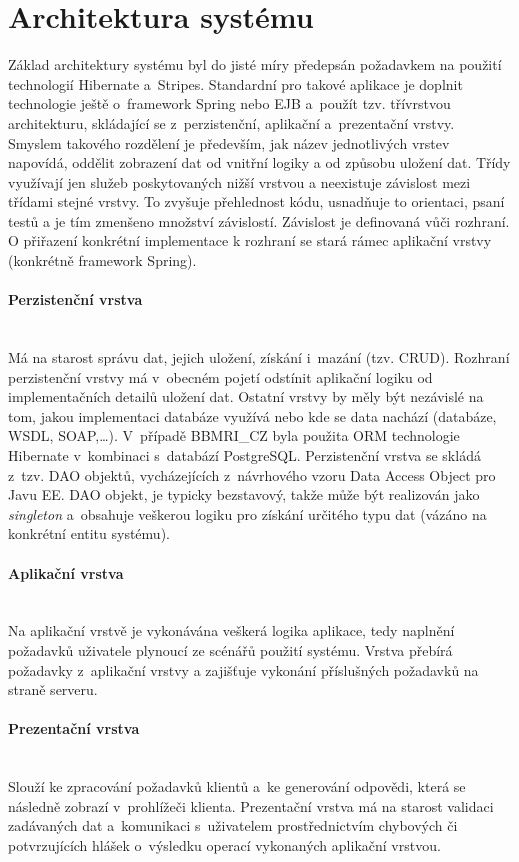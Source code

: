 \documentclass[11pt,draft,oneside]{fithesis2}
\newcommand{\paragraphNewLine}[1]{\paragraph*{#1}\mbox{}\\}
\newcommand{\ProjectName}{BBMRI\_CZ\xspace}
\begin{document}
\section{Architektura systému}
Základ architektury systému byl do jisté míry předepsán požadavkem na použití technologií Hibernate a~Stripes. Standardní pro takové aplikace je doplnit technologie ještě o~framework Spring nebo EJB a~použít tzv. třívrstvou architekturu, skládající se z~perzistenční, aplikační a~prezentační vrstvy. Smyslem takového rozdělení je především, jak název jednotlivých vrstev napovídá, oddělit zobrazení dat od vnitřní logiky a od způsobu uložení dat. Třídy využívají jen služeb poskytovaných nižší vrstvou a neexistuje závislost mezi třídami stejné vrstvy. To zvyšuje přehlednost kódu, usnadňuje to orientaci, psaní testů a je tím zmenšeno množství závislostí. Závislost je definovaná vůči rozhraní. O přiřazení konkrétní implementace k rozhraní se stará rámec aplikační vrstvy (konkrétně framework Spring).  

\paragraphNewLine{Perzistenční vrstva}
Má na starost správu dat, jejich uložení, získání i~mazání (tzv. CRUD). Rozhraní perzistenční vrstvy má v~obecném pojetí odstínit aplikační logiku od implementačních detailů uložení dat. Ostatní vrstvy by měly být nezávislé na tom, jakou implementaci databáze využívá nebo kde se data nachází (databáze, WSDL, SOAP,\ldots). V~případě \ProjectName byla použita ORM technologie Hibernate v~kombinaci s~databází PostgreSQL. 
Perzistenční vrstva se skládá z~tzv. DAO objektů, vycházejících z~návrhového vzoru Data Access Object pro Javu EE. DAO objekt, je typicky bezstavový, takže může být realizován jako \textit{singleton} a~obsahuje veškerou logiku pro získání určitého typu dat (vázáno na konkrétní entitu systému).

\paragraphNewLine{Aplikační vrstva} 
Na aplikační vrstvě je vykonávána veškerá logika aplikace, tedy naplnění požadavků uživatele plynoucí ze scénářů použití systému. Vrstva přebírá požadavky z~aplikační vrstvy a zajišťuje vykonání příslušných požadavků na straně serveru. 

\paragraphNewLine{Prezentační vrstva} 
Slouží ke zpracování požadavků klientů a~ke generování odpovědi, která se následně zobrazí v~prohlížeči klienta. Prezentační vrstva má na starost validaci zadávaných dat a~komunikaci s~uživatelem prostřednictvím chybových či potvrzujících hlášek o~výsledku operací vykonaných aplikační vrstvou. 
\end{document}

